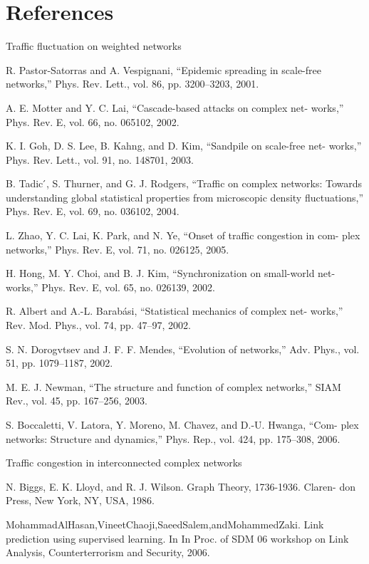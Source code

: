 \documentclass[onecolumn,preprintnumbers,amsmath,amssymb]{revtex4}
\begin{document}
\section*{References}
\begin{thebibliography}{00}

Traffic fluctuation on weighted networks

 R. Pastor-Satorras and A. Vespignani, “Epidemic spreading in scale-free networks,” Phys. Rev. Lett., vol. 86, pp. 3200–3203, 2001.

 A. E. Motter and Y. C. Lai, “Cascade-based attacks on complex net- works,” Phys. Rev. E, vol. 66, no. 065102, 2002.

 K. I. Goh, D. S. Lee, B. Kahng, and D. Kim, “Sandpile on scale-free net- works,” Phys. Rev. Lett., vol. 91, no. 148701, 2003.

 B. Tadic ́, S. Thurner, and G. J. Rodgers, “Traffic on complex networks: Towards understanding global statistical properties from microscopic density fluctuations,” Phys. Rev. E, vol. 69, no. 036102, 2004.

 L. Zhao, Y. C. Lai, K. Park, and N. Ye, “Onset of traffic congestion in com- plex networks,” Phys. Rev. E, vol. 71, no. 026125, 2005.

 H. Hong, M. Y. Choi, and B. J. Kim, “Synchronization on small-world net- works,” Phys. Rev. E, vol. 65, no. 026139, 2002.

 R. Albert and A.-L. Barabási, “Statistical mechanics of complex net- works,” Rev. Mod. Phys., vol. 74, pp. 47–97, 2002.

 S. N. Dorogvtsev and J. F. F. Mendes, “Evolution of networks,” Adv. Phys., vol. 51, pp. 1079–1187, 2002.

 M. E. J. Newman, “The structure and function of complex networks,” SIAM Rev., vol. 45, pp. 167–256, 2003.

 S. Boccaletti, V. Latora, Y. Moreno, M. Chavez, and D.-U. Hwanga, “Com- plex networks: Structure and dynamics,” Phys. Rep., vol. 424, pp. 175–308, 2006.

Traffic congestion in interconnected complex networks

N. Biggs, E. K. Lloyd, and R. J. Wilson. Graph Theory, 1736-1936. Claren- don Press, New York, NY, USA, 1986.

MohammadAlHasan,VineetChaoji,SaeedSalem,andMohammedZaki. Link prediction using supervised learning. In In Proc. of SDM 06 workshop on Link Analysis, Counterterrorism and Security, 2006.


\end{thebibliography}
\end{document}
